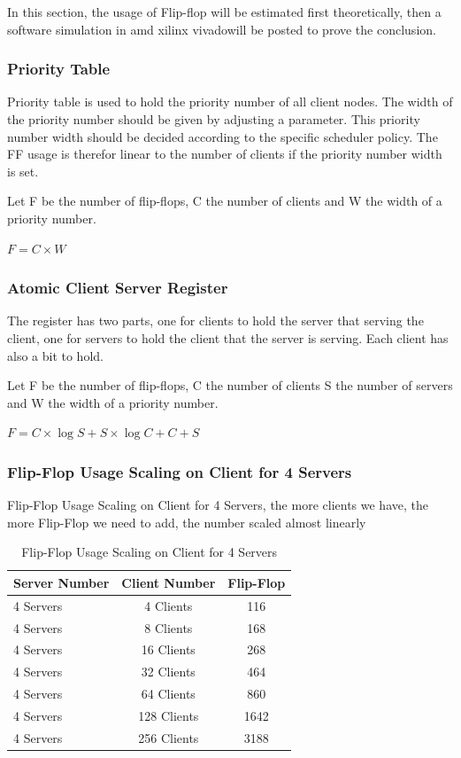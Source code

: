 In this section, the usage of Flip-flop will be estimated first theoretically, then a software simulation in amd xilinx vivado\texttrademark will be posted to prove the conclusion.

\subsubsection{Priority Table }

Priority table is used to hold the priority number of all client nodes. The width of the priority number should be given by adjusting a parameter. This priority number width should be decided according to the specific scheduler policy. The FF usage is therefor linear to the number of clients if the priority number width is set.

Let F be the number of flip-flops, C the number of clients and W the width of a priority number.
     
$F = C \times W $

\subsubsection{Atomic Client Server Register}

The register has two parts, one for clients to hold the server that serving the client, one for servers to hold the client that the server is serving. Each client has also a bit to hold.

Let F be the number of flip-flops, C the number of clients S the number of servers and W the width of a priority number.
     
$F = C \times \log{S} + S \times \log{C} +C+S$

\subsubsection{Flip-Flop Usage Scaling on Client for 4 Servers}


Flip-Flop Usage Scaling on Client for 4 Servers, the more clients we have, the more Flip-Flop we need to add, the number scaled almost linearly 


\begin{table}[htb]
	\centering
	\caption{Flip-Flop Usage Scaling on Client for 4 Servers}
	\begin{tabular}{l c c}
		\toprule
		Server Number  & Client Number  & Flip-Flop\\ \midrule
        4	Servers	&	4	Clients	&	116	\\
        4	Servers	&	8	Clients	&	168	\\
        4	Servers	&	16	Clients	&	268	\\
        4	Servers	&	32	Clients	&	464	\\
        4	Servers	&	64	Clients	&	860	\\
        4	Servers	&	128	Clients	&	1642	\\
        4	Servers	&	256	Clients	&	3188	\\
		\bottomrule
	\end{tabular}
	\label{tab:ffs4}
\end{table}

